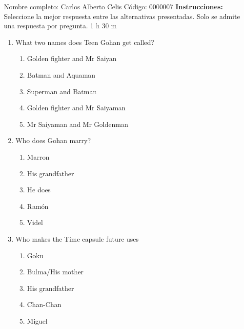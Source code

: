 \documentclass[letterpaper,addpoints,answers,twocolumn,10pt]{exam}
\begin{document}
\noindent Nombre completo: Carlos Alberto Celis
\newline \newline \newline \newline
Código: 0000007\newline \newline 
{\bf Instrucciones:} Seleccione la mejor respuesta entre las alternativas presentadas. Solo se admite una respuesta por pregunta.
 1 h 30 m

\begin{enumerate}[leftmargin=.2in]




\item  What two names does Teen Gohan get called?


\begin{enumerate}[noitemsep,leftmargin=0in]


\item  Golden fighter and Mr Saiyan
\item  Batman and Aquaman
\item  Superman and Batman
\item  Golden fighter and Mr Saiyaman
\item  Mr Saiyaman and Mr Goldenman


\end{enumerate}



\item  Who does Gohan marry?


\begin{enumerate}[noitemsep,leftmargin=0in]


\item  Marron
\item  His grandfather
\item  He does
\item  Ramón
\item  Videl


\end{enumerate}



\item  Who makes the Time capsule future uses


\begin{enumerate}[noitemsep,leftmargin=0in]


\item  Goku
\item  Bulma/His mother
\item  His grandfather
\item  Chan-Chan
\item  Miguel



\end{enumerate}
\end{enumerate}
\end{document}

